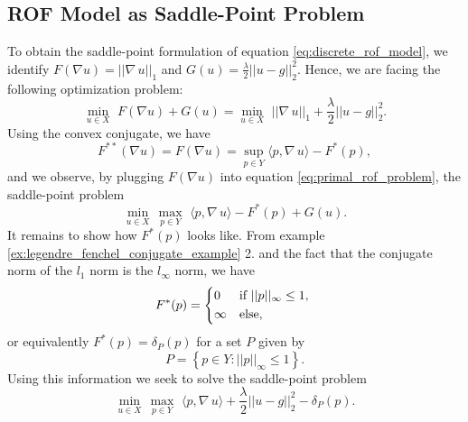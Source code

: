 \documentclass{scrreprt}
\begin{document}
        \subsection{ROF Model as Saddle-Point Problem} %
        \label{sub:rof_model_as_saddle_point_problem}

            To obtain the saddle-point formulation of equation \ref{eq:discrete_rof_model}, we identify $F(\nabla u) = ||\nabla \, u||_{1}$ and $G(u) = \frac{\lambda}{2} ||u - g||_{2}^{2}$. Hence, we are facing the following optimization problem:
                \begin{equation}
                    \min_{u \in X}\,\, F(\nabla u) + G(u) = \min_{u \in X}\,\, ||\nabla \, u||_{1} + \frac{\lambda}{2} ||u - g||_{2}^{2}.
                \label{eq:primal_rof_problem}
                \end{equation}
            Using the convex conjugate, we have
                $$
                    F^{\ast\ast}(\nabla u) = F(\nabla u) = \sup\limits_{p \in Y} \langle p, \nabla \, u \rangle - F^{\ast}(p),
                $$
            and we observe, by plugging $F(\nabla u)$ into equation \ref{eq:primal_rof_problem}, the saddle-point problem
                $$
                    \min_{u \in X}\, \max_{p \in Y}\,\, \langle p, \nabla \, u \rangle - F^{\ast}(p) + G(u).
                $$
            It remains to show how $F^{\ast}(p)$ looks like. From example \ref{ex:legendre_fenchel_conjugate_example} 2. and the fact that the conjugate norm of the $l_{1}$ norm is the $l_{\infty}$ norm, we have
                $$
                    F^{\ast}(p) =
                        \begin{dcases*}
                            0 & \textnormal{if $||p||_{\infty} \le 1$,} \\
                            \infty & \textnormal{else},
                        \end{dcases*}
                $$
            or equivalently $F^{\ast}(p) = \delta_{P}(p)$ for a set $P$ given by
                \begin{equation}
                    P = \left\{ p \in Y : ||p||_{\infty} \le 1 \right\}.
                    \label{eq:the_set_P}
                \end{equation}
            Using this information we seek to solve the saddle-point problem
                \begin{equation}
                    \min_{u \in X}\, \max_{p \in Y}\,\, \langle p, \nabla\, u \rangle + \frac{\lambda}{2} ||u - g||_{2}^{2} - \delta_{P}(p).
                \label{eq:primal_dual_rof_problem}
                \end{equation}
\end{document}
